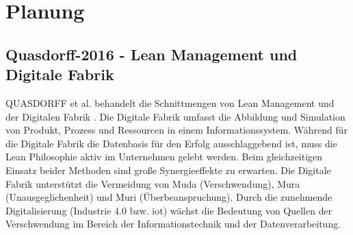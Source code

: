 % 
%  
%  
%  
 
\section{Planung}
\subsection*{Quasdorff-2016 - Lean Management und Digitale Fabrik}

QUASDORFF et al. behandelt die Schnittmengen von Lean Management und der Digitalen Fabrik \cite{Quasdorff2016}. 
%
Die Digitale Fabrik umfasst die Abbildung und Simulation von Produkt, Prozess und Ressourcen in einem Informationssystem. Während für die Digitale Fabrik die Datenbasis für den Erfolg ausschlaggebend ist, muss die Lean Philosophie aktiv im Unternehmen gelebt werden. Beim gleichzeitigen Einsatz beider Methoden sind große Synergieeffekte zu erwarten. 
%
Die Digitale Fabrik unterstützt die Vermeidung von Muda (Verschwendung), Mura (Unausgeglichenheit) und Muri (Überbeanspruchung). Durch die zunehmende Digitalisierung (Industrie 4.0 bzw. \gls{iot}) wächst die Bedeutung von Quellen der Verschwendung im Bereich der Informationstechnik und der Datenverarbeitung. 

